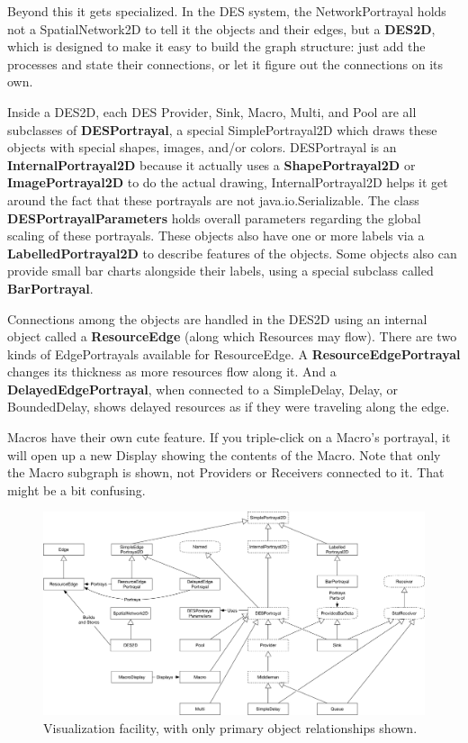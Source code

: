 \documentclass[twoside,10pt]{article}
\begin{document}
Beyond this it gets specialized.  In the DES system, the NetworkPortrayal holds not a SpatialNetwork2D to tell it the objects and their edges, but a {\bf DES2D}, which is designed to make it easy to build the graph structure: just add the processes and state their connections, or let it figure out the connections on its own.   

Inside a DES2D, each DES Provider, Sink, Macro, Multi, and Pool are all subclasses of {\bf DESPortrayal}, a special SimplePortrayal2D which draws these objects with special shapes, images, and/or colors.    DESPortrayal is an {\bf InternalPortrayal2D} because it actually uses a {\bf ShapePortrayal2D} or {\bf ImagePortrayal2D} to do the actual drawing, InternalPortrayal2D helps it get around the fact that these portrayals are not java.io.Serializable.  The class {\bf DESPortrayalParameters} holds overall parameters regarding the global scaling of these portrayals.  These objects also have one or more labels via a {\bf LabelledPortrayal2D} to describe features of the objects.  Some objects also can provide small bar charts alongside their labels, using a special subclass called {\bf BarPortrayal}.

Connections among the objects are handled in the DES2D using an internal object called a {\bf ResourceEdge} (along which Resources may flow).  There are two kinds of EdgePortrayals available for ResourceEdge.  A {\bf ResourceEdgePortrayal} changes its thickness as more resources flow along it.  And a {\bf DelayedEdgePortrayal}, when connected to a SimpleDelay, Delay, or BoundedDelay, shows delayed resources as if they were traveling along the edge.

Macros have their own cute feature.  If you triple-click on a Macro's portrayal, it will open up a new Display showing the contents of the Macro.  Note that only the Macro subgraph is shown, not Providers or Receivers connected to it.  That might be a bit confusing.


\begin{figure}[t]
\centering\includegraphics[width=6.5in]{VisualizationUML.pdf}
\caption{Visualization facility, with only primary object relationships shown.}
\end{figure}
\end{document}
